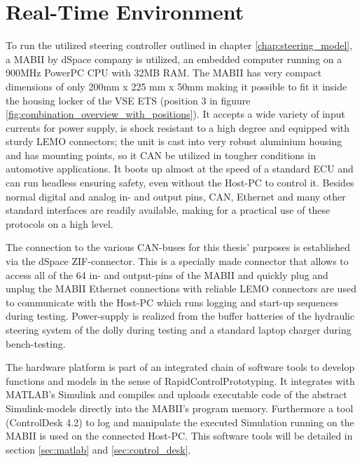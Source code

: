 \documentclass[ExampleMasters.tex]{subfiles}
\begin{document}
\section{Real-Time Environment}
\label{sec:realtime_environment}

To run the utilized steering controller outlined in chapter \ref{chap:steering_model}, a \gls{MABII} by dSpace company is utilized, an embedded computer running on a 900MHz PowerPC CPU with 32MB RAM. The \gls{MABII} has very compact dimensions of only 200mm x 225 mm x 50mm making it possible to fit it inside the housing locker of the \gls{VSE} \gls{ETS} (position 3 in figuure \ref{fig:combination_overview_with_positions}). It accepts a wide variety of input currents for power supply, is shock resistant to a high degree and equipped with sturdy \gls{LEMO}  connectors; the unit is cast into very robust aluminium housing and has mounting points, so it \gls{CAN} be utilized in tougher conditions in automotive applications. It boots up almost at the speed of a standard \gls{ECU} and can run headless ensuring safety, even without the Host-PC to control it. Besides normal digital and analog in- and output pins, CAN, Ethernet and many other standard interfaces are readily available, making for a practical use of these protocols on a high level. 

The connection to the various \gls{CAN}-buses for this thesis' purposes is established via the dSpace \gls{ZIF}-connector. This is a specially made connector that allows to access all of the 64 in- and output-pins of the \gls{MABII} and quickly plug and unplug the \gls{MABII} Ethernet connections with reliable \gls{LEMO}  connectors are used to communicate with the Host-PC which runs logging and start-up sequences during testing. Power-supply is realized from the buffer batteries of the hydraulic steering system of the dolly during testing and a standard laptop charger during bench-testing.

The hardware platform is part of an integrated chain of software tools to develop functions and models in the sense of RapidControlPrototyping. It integrates with MATLAB's Simulink and compiles and uploads executable code of the abstract Simulink-models directly into the MABII's program memory. Furthermore a tool (ControlDesk 4.2) to log and manipulate the executed Simulation running on the \gls{MABII} is used on the connected Host-PC. This software tools will be detailed in section \ref{sec:matlab} and \ref{sec:control_desk}.\cite{MABII_product_descr}
\end{document}
